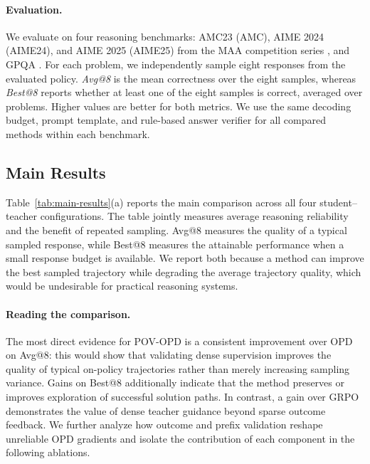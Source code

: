 \paragraph{Evaluation.}
We evaluate on four reasoning benchmarks: AMC23 (AMC), AIME 2024 (AIME24), and AIME 2025 (AIME25) from the MAA competition series \cite{maa2025competitions}, and GPQA \cite{rein2023gpqa}. For each problem, we independently sample eight responses from the evaluated policy. \emph{Avg@8} is the mean correctness over the eight samples, whereas \emph{Best@8} reports whether at least one of the eight samples is correct, averaged over problems. Higher values are better for both metrics. We use the same decoding budget, prompt template, and rule-based answer verifier for all compared methods within each benchmark.

\subsection{Main Results}

Table~\ref{tab:main-results}(a) reports the main comparison across all four student--teacher configurations. The table jointly measures average reasoning reliability and the benefit of repeated sampling. Avg@8 measures the quality of a typical sampled response, while Best@8 measures the attainable performance when a small response budget is available. We report both because a method can improve the best sampled trajectory while degrading the average trajectory quality, which would be undesirable for practical reasoning systems.

\paragraph{Reading the comparison.}
The most direct evidence for POV-OPD is a consistent improvement over OPD on Avg@8: this would show that validating dense supervision improves the quality of typical on-policy trajectories rather than merely increasing sampling variance. Gains on Best@8 additionally indicate that the method preserves or improves exploration of successful solution paths. In contrast, a gain over GRPO demonstrates the value of dense teacher guidance beyond sparse outcome feedback. We further analyze how outcome and prefix validation reshape unreliable OPD gradients and isolate the contribution of each component in the following ablations.


